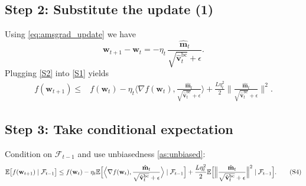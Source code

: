 \documentclass[11pt]{article}
\newcommand{\EE}{\mathbb{E}}
\begin{document}
\subsection*{Step 2: Substitute the update (1)}
Using \eqref{eq:amsgrad_update} we have
\[
\mathbf{w}_{t+1}-\mathbf{w}_{t}=-
\eta_{t}\,\frac{\hat{\mathbf{m}}_{t}}{\sqrt{\hat{\mathbf{v}}_{t}^{\text{bc}}}+\epsilon}.
\tag{S2}
\]
Plugging \eqref{S2} into \eqref{S1} yields
\[
\begin{aligned}
f(\mathbf{w}_{t+1})\le&
f(\mathbf{w}_{t})
-\eta_{t}\Big\langle\nabla f(\mathbf{w}_{t}),
\frac{\hat{\mathbf{m}}_{t}}{\sqrt{\hat{\mathbf{v}}_{t}^{\text{bc}}}+\epsilon}\Big\rangle
+\frac{L\eta_{t}^{2}}{2}
\Big\|\frac{\hat{\mathbf{m}}_{t}}
{\sqrt{\hat{\mathbf{v}}_{t}^{\text{bc}}}+\epsilon}\Big\|^{2}.
\end{aligned}
\tag{S3}
\]

\subsection*{Step 3: Take conditional expectation}
Condition on $\mathcal{F}_{t-1}$ and use unbiasedness \ref{as:unbiased}:
\[
\EE\bigl[f(\mathbf{w}_{t+1})\mid\mathcal{F}_{t-1}\bigr]
\le f(\mathbf{w}_{t})
-\eta_{t}\EE\Bigl[\Big\langle\nabla f(\mathbf{w}_{t}),
\frac{\hat{\mathbf{m}}_{t}}{\sqrt{\hat{\mathbf{v}}_{t}^{\text{bc}}}+\epsilon}
\Big\rangle\mid\mathcal{F}_{t-1}\Bigr]
+\frac{L\eta_{t}^{2}}{2}
\EE\Bigl[\Big\|\frac{\hat{\mathbf{m}}_{t}}
{\sqrt{\hat{\mathbf{v}}_{t}^{\text{bc}}}+\epsilon}\Big\|^{2}\mid\mathcal{F}_{t-1}\Bigr].
\tag{S4}
\]
\end{document}
